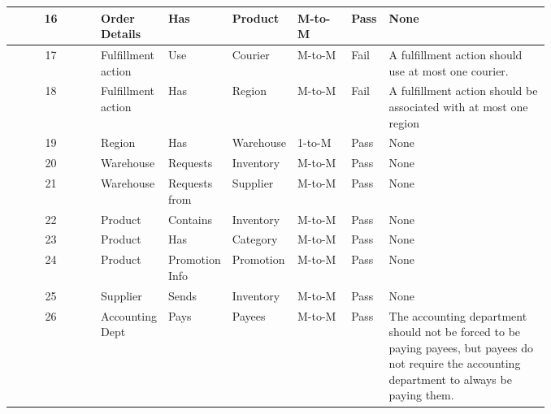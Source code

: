 \documentclass{article}
\begin{document}
\begin{longtable}{ | c | p{0.1\linewidth} | p{0.1\linewidth} | p{0.1\linewidth} | p{0.1\linewidth} | p{0.07\linewidth} | p{0.3\linewidth} | }
	16	& Order Details & Has & Product & M-to-M & Pass & None\\\hline
	17	& Fulfillment action & Use & Courier & M-to-M & Fail & A fulfillment action should use at most one courier.\\\hline
	18	& Fulfillment action & Has & Region & M-to-M & Fail & A fulfillment action should be associated with at most one region\\\hline
	19	& Region & Has & Warehouse & 1-to-M & Pass & None \\\hline
	20	& Warehouse & Requests & Inventory & M-to-M & Pass & None \\\hline
	21	& Warehouse & Requests from & Supplier & M-to-M & Pass & None \\\hline
	22	& Product & Contains & Inventory & M-to-M & Pass & None \\\hline
	23	& Product & Has & Category & M-to-M & Pass & None \\\hline
	24	& Product & Promotion Info & Promotion & M-to-M & Pass & None\\\hline
	25	& Supplier & Sends & Inventory & M-to-M & Pass & None \\\hline
	26	& Accounting Dept & Pays & Payees & M-to-M & Pass & The accounting department should not be forced to be paying payees, but payees do not require the accounting department to always be paying them.\\\hline
\end{longtable}
\end{document}

